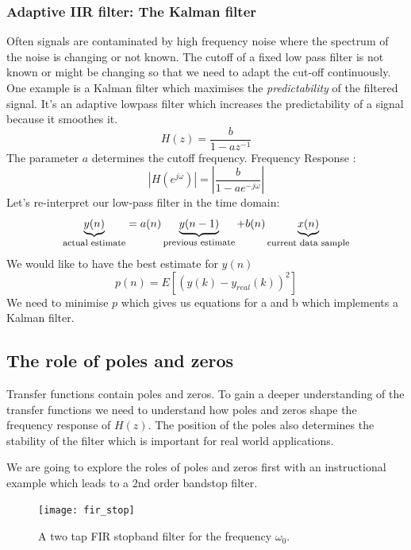 \documentclass[12pt,a4paper]{article}
\begin{document}
\subsubsection{Adaptive IIR filter: The Kalman filter}
Often signals are contaminated by high frequency noise where the
spectrum of the noise is changing or not known. The cutoff of a fixed low
pass filter is not known or might be changing so that we need to adapt the cut-off continuously.
One example is a Kalman filter which maximises the
\textsl{predictability} of the filtered signal. It's an adaptive lowpass filter
which increases the predictability of a signal because it smoothes it.
\begin{equation} 
H(z) = \frac{b}{1 - a z^{-1}}
\end{equation}
The parameter $a$ determines the cutoff frequency.
Frequency Response :
\begin{equation} 
|H(e^{j \omega}) | = |\frac{b}{1 - a e^{-j \omega}}| 
\end{equation}
Let's re-interpret our low-pass filter in the time domain:
\begin{equation} 
\underbrace{y(n)}_{\mbox {\footnotesize actual estimate}} = a(n) \underbrace{y(n - 1)}_{\mbox{\footnotesize previous estimate}} + b(n)\underbrace{x(n)}_{\mbox{\footnotesize current data sample}} 
\end{equation}
We would like to have the best estimate for $y(n)$
\begin{equation} 
p(n) = E[ \left( y (k) - y_{real} (k)\right)^{2}] 
\end{equation}
We need to minimise $p$ which gives us equations for a and b which
implements a Kalman filter.




\subsection{The role of poles and zeros}
Transfer functions contain poles and zeros. To gain a deeper
understanding of the transfer functions we need to understand
how poles and zeros shape the frequency response of $H(z)$.
The position of the poles also determines the stability of the filter
which is important for real world applications.

We are going to explore the roles of poles and zeros first with
an instructional example which leads to a 2nd order bandstop filter.

\begin{figure}[!hbt]
\begin{center}
\mbox{\texttt{[image: fir\_stop]}}
\end{center}
\caption{A two tap FIR stopband filter for the frequency $\omega_0$.
\label{fir_stop}}
\end{figure}
\end{document}

